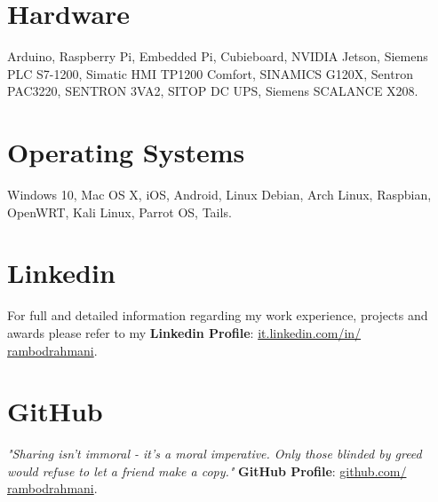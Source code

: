 \documentclass[]{friggeri-cv}
\begin{document}
\begin{aside}\vspace{-2.8cm}
\section{Hardware}
Arduino, Raspberry Pi, Embedded Pi, Cubieboard, NVIDIA Jetson, Siemens PLC S7-1200, Simatic HMI TP1200 Comfort, SINAMICS G120X, Sentron PAC3220, SENTRON 3VA2, SITOP DC UPS, Siemens SCALANCE X208.
\section{Operating Systems \textcolor{orange}{\faLinux}}
Windows 10, Mac OS X, iOS, Android, Linux Debian, Arch Linux, Raspbian, OpenWRT,
Kali Linux, Parrot OS, Tails.\vspace{6mm}
\section{Linkedin \textcolor{blue}{\faLinkedinSquare}}
For full and detailed information regarding my work experience, projects and
awards please refer to my \textbf{Linkedin Profile}:
\href{http://it.linkedin.com/in/rambodrahmani}{{it.linkedin.com/in/}}\\\href{http://it.linkedin.com/in/rambodrahmani}{{rambodrahmani}}.\vspace{6mm}
\section{GitHub \textcolor{teal}{\faGithub}}
\emph{"Sharing isn't immoral - it's a moral imperative. Only those blinded by
greed would refuse to let a friend make a copy."}\vspace{1mm}
\textbf{GitHub Profile}: \href{http://github.com/rambodrahmani}{{github.com/}}\\\href{http://github.com/rambodrahmani}{{rambodrahmani}}.\vspace{6mm}
\end{aside}
\end{document}
